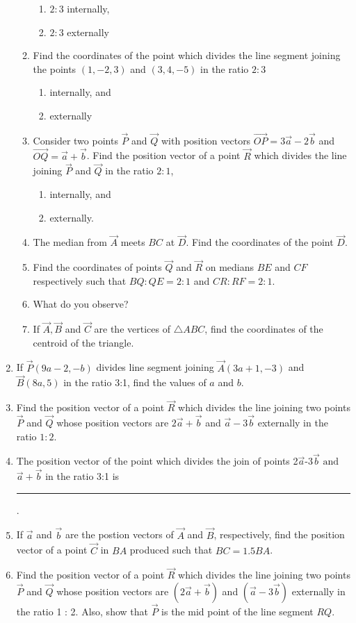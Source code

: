 \begin{enumerate}[label=\thesubsection.\arabic*,ref=\thesubsection.\theenumi]
\begin{enumerate}
\begin{enumerate}
\item $2:3$ internally,
\item $2:3$ externally
\end{enumerate}
\item Find the coordinates of the point which divides the line segment joining the points $(1,-2,3)$ and $(3,4,-5)$ in the ratio $2:3$
\begin{enumerate}
\item internally, and
\item externally
\end{enumerate}
\item Consider two points $\vec{P}$ and $\vec{Q}$ with position vectors $\overrightarrow{OP} = 3\overrightarrow{a}-2\overrightarrow{b}$ and $\overrightarrow{OQ}=\overrightarrow{a}+\overrightarrow{b}$. Find the position vector of a point $\vec{R}$ which divides the line joining $\vec{P}$ and $\vec{Q}$ in the ratio $2:1$, 
\begin{enumerate}
\item internally, and 
\item externally.
\end{enumerate}
\item The median from $\vec{A}$ meets $BC$ at $\vec{D}$. Find the coordinates of the point $\vec{D}$.
\item Find the coordinates of points $\vec{Q}$ and $\vec{R}$ on medians $BE$ and $CF$ respectively such that $BQ : QE = 2 : 1$  and  $CR : RF = 2 : 1$.
\item What do you observe?
\item If $\vec{A}, \vec{B}$ and $\vec{C}$  are the vertices of $\triangle ABC$, find the coordinates of the centroid of the triangle.
\end{enumerate}
\solution
	
\item If $\vec{P}(9a-2,-b)$ divides line segment joining $\vec{A}(3a+1,-3)$ and $\vec{B}(8a,5)$ in the ratio 3:1, find the values of $a$ and $b$.
\item Find the position vector of a point $\vec{R}$ which divides the line joining two points $\vec{P}$ and $\vec{Q}$ whose position vectors are $2\vec{a}+\vec{b}$ and $\vec{a}-3\vec{b}$ externally in the ratio $1:2$.
\item The position vector of the point which divides the join of points 2$\vec{a}$-3$\vec{b}$ $\text{and}$ $\vec{a}+\vec{b}$ in the ratio 3:1 is \rule{1cm}{0.1pt}.
\item If $\vec{a}$ and $\vec{b}$ are the postion vectors of $\vec{A}$ and $\vec{B}$, respectively, find the position vector of a point $\vec{C}$ in $BA$ produced such that $BC=1.5BA$.
\item Find the position vector of a point $\vec{R}$ which divides the line joining two points $\vec{P}$ and $\vec{Q}$ whose position vectors are $(2\vec{a}+\vec{b})$ and $(\vec{a}-3\vec{b})$
externally in the ratio 1 : 2. Also, show that $\vec{P}$ is the mid point of the line segment $RQ$.
\end{enumerate}
